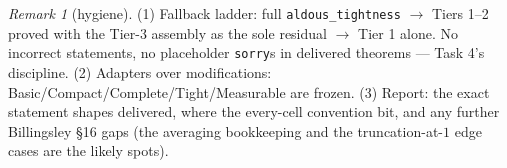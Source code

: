 \documentclass[11pt]{article}
\theoremstyle{plain}
\theoremstyle{remark}
\newtheorem{remark}{Remark}
\begin{document}
\begin{remark}[hygiene]
(1) Fallback ladder: full \texttt{aldous\_tightness} $\to$ Tiers 1--2 proved
with the Tier-3 assembly as the sole residual $\to$ Tier 1 alone. No
incorrect statements, no placeholder \texttt{sorry}s in delivered theorems
--- Task 4's discipline.
(2) Adapters over modifications: Basic/Compact/Complete/Tight/Measurable are
frozen.
(3) Report: the exact statement shapes delivered, where the every-cell
convention bit, and any further Billingsley \S16 gaps (the averaging
bookkeeping and the truncation-at-$1$ edge cases are the likely spots).
\end{remark}
\end{document}
